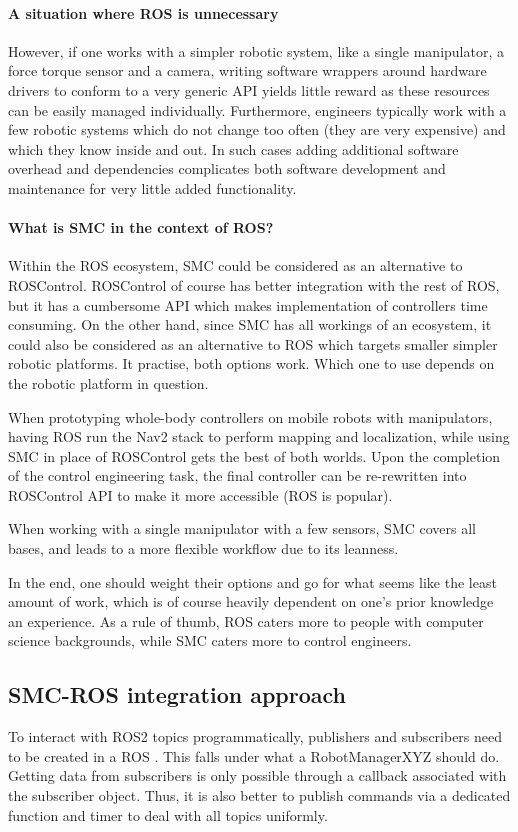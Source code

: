 \paragraph{A situation where ROS is unnecessary}
However, if one works with a simpler robotic system, like a single
manipulator, a force torque sensor and a camera, writing software wrappers
around hardware drivers to conform to a very generic API yields little reward
as these resources can be easily managed individually.
Furthermore, engineers typically work with a few robotic systems
which do not change too often (they are very expensive)
and which they know inside and out. In such cases
adding additional software overhead and dependencies complicates
both software development and maintenance
for very little added functionality.

\paragraph{What is SMC in the context of ROS?}
Within the ROS ecosystem, SMC could be considered as an alternative to ROSControl.
ROSControl of course has better integration with the rest of ROS,
but it has a cumbersome API which makes implementation of controllers time consuming.
On the other hand, since SMC has all workings of an ecosystem,
it could also be considered as an alternative to ROS which targets 
smaller simpler robotic platforms.
It practise, both options work. Which one to use depends 
on the robotic platform in question.

When prototyping whole-body controllers on mobile robots with manipulators,
having ROS run the Nav2 stack to perform mapping and localization,
while using SMC in place of ROSControl gets the best of both worlds.
Upon the completion of the control engineering task, the final controller
can be re-rewritten into ROSControl API to make it more accessible (ROS is popular).

When working with a single manipulator with a few sensors, SMC covers all bases,
and leads to a more flexible workflow due to its leanness.

In the end, one should weight their options and go for what seems like the least
amount of work, which is of course heavily dependent
on one's prior knowledge an experience. As a rule of thumb,
ROS caters more to people with computer science backgrounds,
while SMC caters more to control engineers.

\subsection{SMC-ROS integration approach}
To interact with ROS2 topics programmatically, publishers and subscribers need to be created in a 
ROS . This falls under what a RobotManagerXYZ should do.
Getting data from subscribers is only possible through a callback associated with the subscriber object.
Thus, it is also better to publish commands via a dedicated function and timer
to deal with all topics uniformly.

